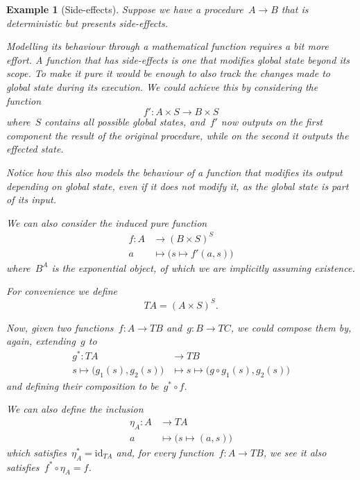\documentclass[a4paper]{article}
\theoremstyle{plain}
\newtheorem{example}[theorem]{Example}
\theoremstyle{definition}
\newcommand{\id}{\mathrm{id}}
\begin{document}
\begin{example}[Side-effects]
    \label{ex:kleisli-side-effects}
    Suppose we have a procedure~\(A\longrightarrow B\) that is deterministic but
    presents side-effects.

    Modelling its behaviour through a mathematical function requires a bit more
    effort. A function that has side-effects is one that modifies global state
    beyond its scope. To make it pure it would be enough to also track the
    changes made to global state during its execution.  We could achieve this by
    considering the function
    \[
        f':A\times S\longrightarrow B\times S
    \]
    where~\(S\) contains all possible global states, and~\(f'\) now outputs on
    the first component the result of the original procedure, while on the
    second it outputs the effected state.

    Notice how this also models the behaviour of a function that modifies its
    output depending on global state, even if it does not modify it, as the
    global state is part of its input.

    We can also consider the induced pure function
    \begin{align*}
        f:A&\longrightarrow(B\times S)^{S} \\
        a&\longmapsto\bigr(s\mapsto f'(a,s)\bigl)
    \end{align*}
    where~\(B^{A}\) is the exponential object, of which we are implicitly
    assuming existence.

    For convenience we define
    \[
        TA = (A\times S)^{S}.
    \]

    Now, given two functions~\(f:A\longrightarrow TB\)
    and~\(g:B\longrightarrow TC\), we could compose them by, again,
    extending~\(g\) to
    \begin{align*}
        g^{\ast}:TA&\longrightarrow TB \\
        s\mapsto\bigl(g_{1}(s),g_{2}(s)\bigr)&\longmapsto
        s\mapsto\bigl(g\circ g_{1}(s),g_{2}(s)\bigr)
    \end{align*}
    and defining their composition to be~\(g^{\ast} \circ f\).

    We can also define the inclusion
    \begin{align*}
        \eta_{A}:A&\longrightarrow TA \\
        a&\longmapsto\bigl(s\mapsto(a,s)\bigr)
    \end{align*}
    which satisfies~\(\eta_{A}^{\ast}=\id_{TA}\) and, for every
    function~\(f:A\longrightarrow TB\), we see it also
    satisfies~\(f^{\ast}\circ\eta_{A}=f\).
\end{example}
\end{document}
